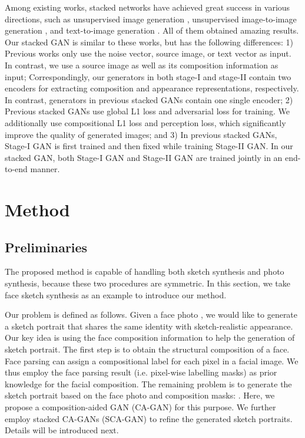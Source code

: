 \documentclass[journal]{IEEEtran}
\begin{document}
Among existing works, stacked networks have achieved great success in various directions, such as unsupervised image generation \cite{Huang2016Stacked}, unsupervised image-to-image generation \cite{Li2018Unsupervised}, and text-to-image generation \cite{Zhang2017StackGAN}. All of them obtained amazing results. Our stacked GAN is similar to these works, but has the following differences:
1) Previous works only use the noise vector, source image, or text vector as input. In contrast, we use a source image as well as its composition information as input;
Correspondingly, our generators in both stage-I and stage-II contain two encoders for extracting composition and appearance representations, respectively. In contrast, generators in previous stacked GANs contain one single encoder;
2) Previous stacked GANs use global L1 loss and adversarial loss for training. We additionally use compositional L1 loss and perception loss, which significantly improve the quality of generated images; and 
3) In previous stacked GANs, Stage-I GAN is first trained and then fixed while training Stage-II GAN. In our stacked GAN, both Stage-I GAN and Stage-II GAN are trained jointly in an end-to-end manner. 






\section{Method}
\label{sec:method}

\subsection{Preliminaries}
\label{sec:preliminary}

The proposed method is capable of handling both sketch synthesis and photo synthesis, because these two procedures are symmetric. In this section, we take face sketch synthesis as an example to introduce our method. 

Our problem is defined as follows. Given a face photo , we would like to generate a sketch portrait  that shares the same identity with sketch-realistic appearance. Our key idea is using the face composition information to help the generation of sketch portrait.
The first step is to obtain the structural composition of a face. Face parsing can assign a compositional label for each pixel in a facial image. We thus employ the face parsing result (i.e. pixel-wise labelling masks)  as prior knowledge for the facial composition.
The remaining problem is to generate the sketch portrait based on the face photo and composition masks: . Here, we propose a composition-aided GAN (CA-GAN) for this purpose.
We further employ stacked CA-GANs (SCA-GAN) to refine the generated sketch portraits.
Details will be introduced next.
\end{document}
